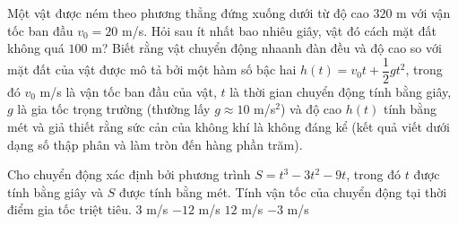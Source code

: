 \begin{bt}%
	Một vật được ném theo phương thẳng đứng xuống dưới từ độ cao $320$ m với vận tốc ban đầu $v_0=20$ m/s. Hỏi sau ít nhất bao nhiêu giây, vật đó cách mặt đất không quá $100$ m? Biết rằng vật chuyển động nhaanh đàn đều và độ cao so với mặt đất của vật được mô tả bởi một hàm số bậc hai $h(t)=v_0t+\dfrac{1}{2}gt^2$, trong đó $v_0$ m/s là vận tốc ban đầu của vật, $t$ là thời gian chuyển động tính bằng giây, $g$ là gia tốc trọng trường (thường lấy $g \approx 10$ m/s$^2$) và độ cao $h(t)$ tính bằng mét và giả thiết rằng sức cản của không khí là không đáng kể (kết quả viết dưới dạng số thập phân và làm tròn đến hàng phần trăm).
\end{bt}

\begin{ex}%
	Cho chuyển động xác định bởi phương trình $S=t^3-3t^2-9t$, trong đó $t$ được tính bằng giây và $S$ được tính bằng mét. Tính vận tốc của chuyển động tại thời điểm gia tốc triệt  tiêu.
	 \choice
		{$3$  m/s}
		{\True  $-12$ m/s}
		{$12$  m/s}
		{$-3$  m/s}
\end{ex}

